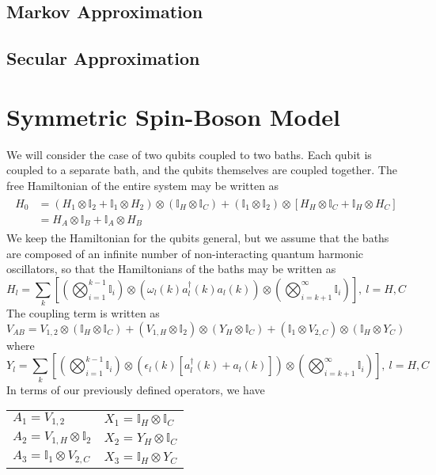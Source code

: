\documentclass{article}
\newcommand{\ten}{\otimes}
\newcommand{\I}{\mathbb{I}}
\begin{document}
\subsection{Markov Approximation}






\subsection{Secular Approximation}





\section{Symmetric Spin-Boson Model}

We will consider the case of two qubits coupled to two baths. Each qubit is coupled to a separate bath, and the qubits themselves are coupled together. The free Hamiltonian of the entire system may be written as
\begin{align}\label{freeham}
\begin{split}
H_0 &= (H_1\ten \I_2 + \I_1\ten H_2)\ten(\I_H\ten \I_C) + (\I_1\ten \I_2)\ten\left[H_H\ten \I_C + \I_H\ten H_C\right]\\
&= H_A\ten \I_B + \I_A\ten H_B
\end{split}
\end{align}
We keep the Hamiltonian for the qubits general, but we assume that the baths are composed of an infinite number of non-interacting quantum harmonic oscillators, so that the Hamiltonians of the baths may be written as
\begin{equation}\label{bathham}
H_l = \sum_k\left[\left(\bigotimes_{i=1}^{k-1}\I_i\right)\ten\left(\omega_l(k) a_l^{\dag}(k)a_l(k)\right)\ten\left(\bigotimes_{i=k+1}^{\infty}\I_i\right)\right],\ l = H,C
\end{equation}
The coupling term is written as
\begin{equation}\label{modcoup}
V_{AB} = V_{1,2}\ten\left(\I_H\ten \I_C\right) + \left(V_{1,H}\ten \I_2\right)\ten\left(Y_H\ten \I_C\right) + \left(\I_1\ten V_{2,C}\right)\ten\left(\I_H\ten Y_C\right)
\end{equation}
where
\begin{equation}\label{yl}
Y_l = \sum_k\left[\left(\bigotimes_{i=1}^{k-1}\I_i\right)\ten\left(\epsilon_l(k)\left[a_l^{\dag}(k) + a_l(k)\right]\right)\ten\left(\bigotimes_{i=k+1}^{\infty}\I_i\right)\right],\ l = H,C
\end{equation}
In terms of our previously defined operators, we have

\begin{tabular}{ll}
	$A_1 = V_{1,2}$ & $X_1 = \I_H\ten\I_C$ \\ 
	$A_2 = V_{1,H}\ten\I_2$ & $X_2 = Y_H\ten\I_C$ \\ 
	$A_3 = \I_1\ten V_{2,C}$ & $X_3 = \I_H\ten Y_C$ \\ 
\end{tabular} 
\end{document}
